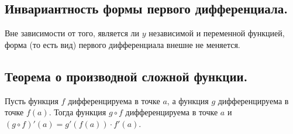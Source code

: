 

\label{sec_Definition08}
\begin{definition}
    \subsection*{Инвариантность формы первого дифференциала.}
    \begin{note}[purple]
        Вне зависимости от того, является ли $y$ независимой и переменной
        функцией, форма (то есть вид) первого дифференциала внешне не меняется.
    \end{note}

    \subsection*{Теорема о производной сложной функции.}
    \begin{note}[purple]
        Пусть функция $f$ дифференцируема в точке $a$, а функция $g$ дифференцируема в точке
        $f(a)$. Тогда функция $g \circ f$ дифференцируема в точке $a$ и 
        $(g \circ f)'(a) = g'(f(a)) \cdot f'(a)$. 
    \end{note}
\end{definition}